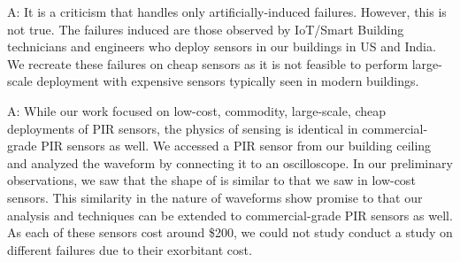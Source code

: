 \begin{description}[style=nextline]
	\item[Q: Are the failures artificial?]
	A: It is a criticism that \sol handles only artificially-induced failures. However, this is not true. The failures induced are those observed by IoT/Smart Building technicians and engineers who deploy sensors in our buildings in US and India. We recreate these failures on cheap sensors as it is not feasible to perform large-scale deployment with expensive sensors typically seen in modern buildings.
	\item[Q: Does \sol work with high-grade PIR sensors?]
	A:  While our work focused on low-cost, commodity, large-scale, cheap deployments of PIR sensors, the physics of sensing is identical in commercial-grade PIR sensors as well. We accessed a PIR sensor from our building ceiling and analyzed the \aout waveform by connecting it to an oscilloscope. In our preliminary observations, we saw that the shape of \aout is similar to that we saw in low-cost sensors. %
	This similarity in the nature of \aout waveforms show promise to that our analysis and techniques can be extended to commercial-grade PIR sensors as well. As each of these sensors cost around \$200, we could not study conduct a study on different failures due to their exorbitant cost.
\end{description}






















































